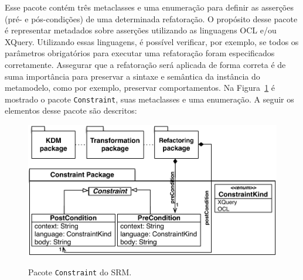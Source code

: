 Esse pacote contém três metaclasses e uma enumeração para definir as asserções (pré- e pós-condições) de uma determinada refatoração. O propósito desse pacote é representar metadados sobre asserções utilizando as linguagens OCL e/ou XQuery. Utilizando essas linguagens, é possível verificar, por exemplo, se todos os parâmetros obrigatórios para executar uma refatoração foram especificados corretamente. Assegurar que a refatoração será aplicada de forma correta é de suma importância para preservar a sintaxe e semântica da instância do metamodelo, como por exemplo, preservar comportamentos. Na Figura~\ref{fig:pacote_constraint_srm} é mostrado o pacote \texttt{Constraint}, suas metaclasses e uma enumeração. A seguir os elementos desse pacote são descritos:

\begin{figure}[h]
	\centering
		\caption{Pacote \texttt{Constraint} do SRM.}
	\includegraphics[scale=0.70]{images/pacoteConstraint3}
	\label{fig:pacote_constraint_srm}
	\fautor
\end{figure}

